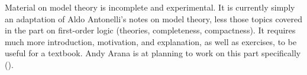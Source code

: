 \documentclass[../../include/open-logic-part]{subfiles}
\begin{document}

\begin{editorial}
  Material on model theory is incomplete and experimental.  It is
  currently simply an adaptation of Aldo Antonelli's notes on model
  theory, less those topics covered in the part on first-order logic
  (theories, completeness, compactness).  It requires much more
  introduction, motivation, and explanation, as well as exercises, to
  be useful for a textbook.  Andy Arana is at planning to work on this
  part specifically ().
\end{editorial}





\OLEndPartHook
\end{document}
